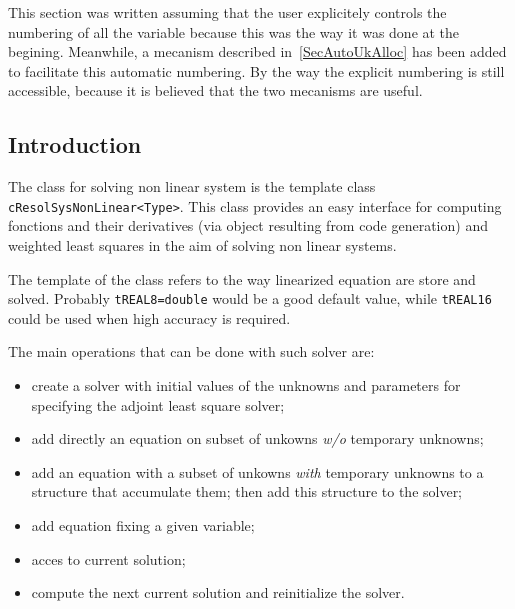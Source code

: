 This section was written assuming that the user explicitely controls the numbering of all
the variable because this was the way it was done at the begining. Meanwhile, a mecanism
described in~\ref{SecAutoUkAlloc} has been added to facilitate this automatic numbering.
By the way the explicit numbering is still accessible, because it is believed that the
two mecanisms are useful.

\subsection{Introduction}

The class for solving  non linear system is the template class 
{\tt  cResolSysNonLinear<Type>}. This class provides an easy interface
for computing fonctions and their derivatives (via object resulting from code generation)
and weighted least squares in the aim of solving non linear systems.

The template of the class refers to the way linearized equation are store and solved.
Probably {\tt tREAL8=double}  would be a good default value, while {\tt tREAL16}
could be used when high accuracy is required.

The main operations that can be done with such solver are:

\UNCLEAR
\begin{itemize}
   \item create a solver with initial values of the unknowns and parameters for
          specifying the adjoint least square solver; 

   \item add directly  an equation on subset of unkowns \emph{w/o} temporary unknowns;

   \item add  an equation with a subset of unkowns \emph{with} temporary unknowns  to
         a structure that accumulate them;  then  add this structure to the solver;

   \item add equation fixing a given variable;

   \item acces to current solution;

   \item compute the next current solution and reinitialize the solver.

\end{itemize}



